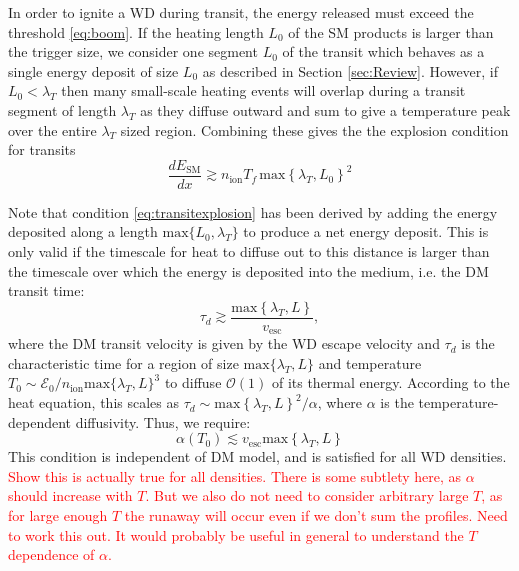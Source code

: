 \documentclass[twocolumn,showpacs,preprintnumbers,amsmath,amssymb,prd]{revtex4}
\newcommand{\OO}{\mathcal{O}}
\begin{document}
In order to ignite a WD during transit, the energy released must exceed the threshold \eqref{eq:boom}.  If the heating length $L_0$ of the SM products is larger than the trigger size, we consider one segment $L_0$ of the transit which behaves as a single energy deposit of size $L_0$ as described in Section \ref{sec:Review}. However, if $L_0 < \lambda_T$ then many small-scale heating events will overlap during a transit segment of length $\lambda_T$ as they diffuse outward and sum to give a temperature peak over the entire $\lambda_T$ sized region. Combining these gives the the explosion condition for transits
\begin{equation}
\label{eq:transitexplosion}
  \frac{d E_\text{SM}}{d x} \gtrsim n_\text{ion} T_f\, \text{max}\left\{\lambda_T, L_0 \right\}^2
\end{equation}

Note that condition \eqref{eq:transitexplosion} has been derived by adding the energy deposited along a length $\text{max} \{L_0, \lambda_T\}$ to produce a net energy deposit.  This is only valid if the timescale for heat to diffuse out to this distance is larger than the timescale over which the energy is deposited into the medium, i.e. the DM transit time:
\begin{equation}
\tau_d \gtrsim \frac{\text{max}\left\{ \lambda_T, L \right\}}{v_\text{esc}},
\end{equation}
where the DM transit velocity is given by the WD escape velocity and $\tau_d$ is the characteristic time for a region of size $\text{max}\{\lambda_T, L\}$ and temperature $T_0 \sim \mathcal{E}_0 / n_\text{ion} \text{max}\{\lambda_T, L\}^3$ to diffuse $\OO(1)$ of its thermal energy.  According to the heat equation, this scales as $\tau_d \sim \text{max}\left\{ \lambda_T, L \right\}^2/\alpha$, where $\alpha$ is the temperature-dependent diffusivity. Thus, we require:
\begin{equation}
\alpha (T_0) \lesssim v_\text{esc} \text{max}\left\{ \lambda_T, L \right\}
\label{eq:SlowDiffusion}
\end{equation}
This condition is independent of DM model, and is satisfied for all WD densities.
\textcolor{red}{Show this is actually true for all densities.} \textcolor{red}{There is some subtlety here, as $\alpha$ should increase with $T$. But we also do not need to consider arbitrary large $T$, as for large enough $T$ the runaway will occur even if we don't sum the profiles. Need to work this out. It would probably be useful in general to understand the $T$ dependence of $\alpha$.}
\end{document}
